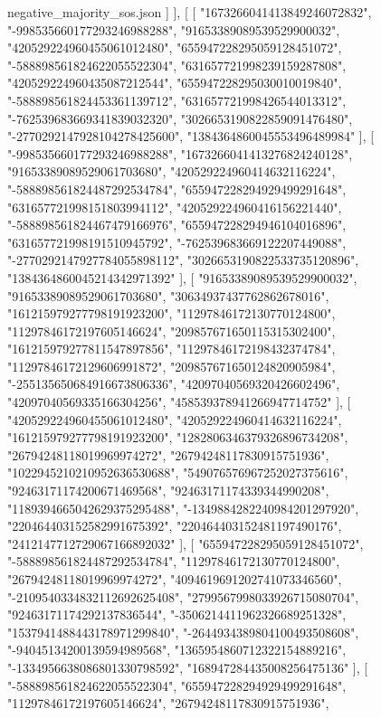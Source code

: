 \begin{filecontents*}[overwrite]{negative_majority_sos.json}
   ]
  ],
  [
   [
    "1673266041413849246072832",
    "-998535660177293246988288",
    "91653389089539529900032",
    "420529224960455061012480",
    "655947228295059128451072",
    "-588898561824622055522304",
    "631657721998239159287808",
    "420529224960435087212544",
    "655947228295030010019840",
    "-588898561824453361139712",
    "631657721998426544013312",
    "-762539683669341839032320",
    "3026653190822859091476480",
    "-2770292147928104278425600",
    "1384364860045553496489984"
   ],
   [
    "-998535660177293246988288",
    "1673266041413276824240128",
    "91653389089529061703680",
    "420529224960414632116224",
    "-588898561824487292534784",
    "655947228294929499291648",
    "631657721998151803994112",
    "420529224960416156221440",
    "-588898561824467479166976",
    "655947228294946104016896",
    "631657721998191510945792",
    "-762539683669122207449088",
    "-2770292147927784055898112",
    "3026653190822533735120896",
    "1384364860045214342971392"
   ],
   [
    "91653389089539529900032",
    "91653389089529061703680",
    "30634937437762862678016",
    "161215979277798191923200",
    "11297846172130770124800",
    "11297846172197605146624",
    "209857671650115315302400",
    "161215979277811547897856",
    "11297846172198432374784",
    "11297846172129606991872",
    "209857671650124820905984",
    "-255135650684916673806336",
    "42097040569320426602496",
    "42097040569335166304256",
    "458539378941266947714752"
   ],
   [
    "420529224960455061012480",
    "420529224960414632116224",
    "161215979277798191923200",
    "1282806346379326896734208",
    "26794248118019969974272",
    "26794248117830915751936",
    "1022945210210952636530688",
    "549076576967252027375616",
    "92463171174200671469568",
    "92463171174339344990208",
    "1189394665042629375295488",
    "-1349884282240984201297920",
    "220464403152582991675392",
    "220464403152481197490176",
    "2412147712729067166892032"
   ],
   [
    "655947228295059128451072",
    "-588898561824487292534784",
    "11297846172130770124800",
    "26794248118019969974272",
    "4094619691202741073346560",
    "-2109540334832112692625408",
    "2799567998033926715080704",
    "92463171174292137836544",
    "-3506214411962326689251328",
    "1537941488443178971299840",
    "-2644934389804100493508608",
    "-94045134200139594989568",
    "1365954860712322154889216",
    "-1334956638086801330798592",
    "168947284435008256475136"
   ],
   [
    "-588898561824622055522304",
    "655947228294929499291648",
    "11297846172197605146624",
    "26794248117830915751936",

\end{filecontents*}
